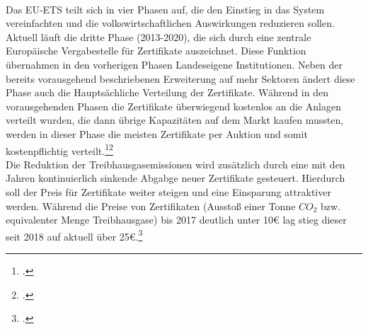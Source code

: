 \\
Das EU-ETS teilt sich in vier Phasen auf, die den Einstieg in das System vereinfachten und die volkswirtschaftlichen Auswirkungen reduzieren sollen. 
Aktuell läuft die dritte Phase (2013-2020), die sich durch eine zentrale Europäische Vergabestelle für Zertifikate auszeichnet. Diese Funktion übernahmen in den vorherigen Phasen Landeseigene Institutionen.
Neben der bereits vorausgehend beschriebenen Erweiterung auf mehr Sektoren ändert diese Phase auch die Hauptsächliche Verteilung der Zertifikate. Während in den vorausgehenden Phasen die Zertifikate überwiegend kostenlos an die Anlagen verteilt wurden, die dann übrige Kapazitäten auf dem Markt kaufen mussten, werden in dieser Phase die meisten Zertifikate per Auktion und somit kostenpflichtig verteilt.\footcite[Vgl.][]{Komission}\footcite[Vgl.][]{Buchner2007}
\\
Die Reduktion der Treibhausgasemissionen wird zusätzlich durch eine mit den Jahren kontinuierlich sinkende Abgabge neuer Zertifikate gesteuert. Hierdurch soll der Preis für Zertifikate weiter steigen und eine Einsparung attraktiver werden.
Während die Preise von Zertifikaten (Ausstoß einer Tonne $CO_2$ bzw. equivalenter Menge Treibhausgase) bis 2017 deutlich unter 10€ lag stieg dieser seit 2018 auf aktuell über 25€.\footcite[Vgl.][]{FinanzenNet}
